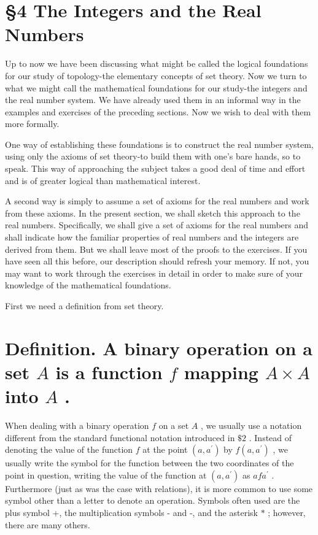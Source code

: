 \section*{§4 The Integers and the Real Numbers}

Up to now we have been discussing what might be called the logical foundations for our study of topology-the elementary concepts of set theory. Now we turn to what we might call the mathematical foundations for our study-the integers and the real number system. We have already used them in an informal way in the examples and exercises of the preceding sections. Now we wish to deal with them more formally.

One way of establishing these foundations is to construct the real number system, using only the axioms of set theory-to build them with one's bare hands, so to speak. This way of approaching the subject takes a good deal of time and effort and is of greater logical than mathematical interest.

A second way is simply to assume a set of axioms for the real numbers and work from these axioms. In the present section, we shall sketch this approach to the real numbers. Specifically, we shall give a set of axioms for the real numbers and shall indicate how the familiar properties of real numbers and the integers are derived from them. But we shall leave most of the proofs to the exercises. If you have seen all this before, our description should refresh your memory. If not, you may want to work through the exercises in detail in order to make sure of your knowledge of the mathematical foundations.

First we need a definition from set theory.

\section*{Definition. A binary operation on a set \(A\) is a function \(f\) mapping \(A \times  A\) into \(A\) .}

When dealing with a binary operation \(f\) on a set \(A\) , we usually use a notation different from the standard functional notation introduced in \(\$ 2\) . Instead of denoting the value of the function \(f\) at the point \(\left( {a,{a}^{\prime }}\right)\) by \(f\left( {a,{a}^{\prime }}\right)\) , we usually write the symbol for the function between the two coordinates of the point in question, writing the value of the function at \(\left( {a,{a}^{\prime }}\right)\) as \({af}{a}^{\prime }\) . Furthermore (just as was the case with relations), it is more common to use some symbol other than a letter to denote an operation. Symbols often used are the plus symbol +, the multiplication symbols - and -, and the asterisk \(*\) ; however, there are many others.

